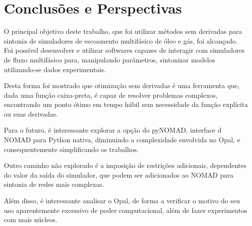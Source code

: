 \chapter{Conclusões e Perspectivas}
%
O principal objetivo deste trabalho, que foi utilizar métodos sem derivadas para sintonia de simuladores de escoamento multifásico de óleo e gás, foi alcançado.
%
Foi possível desenvolver e utilizar softwares capazes de interagir com simuladores de fluxo multifásico para, manipulando parâmetros, sintonizar modelos utilizando-se dados experimentais.
%

Desta forma foi mostrado que otimização sem derivadas é uma ferramenta que, dada uma função caixa-preta, é capaz de resolver problemas complexos, encontrando um ponto ótimo em tempo hábil sem necessidade da função explícita ou suas derivadas.
%

Para o futuro, é interessante explorar a opção do pyNOMAD, interface d NOMAD para Python nativa, diminuindo a complexidade envolvida no Opal, e consequentemente simplificando os trabalhos.
%

Outro caminho não explorado é a imposição de restrições adicionais, dependentes do valor da saída do simulador, que podem ser adicionados ao NOMAD para sintonia de redes mais complexas.
%

Além disso, é interessante analisar o Opal, de forma a verificar o motivo do seu uso aparentemente excessivo de poder computacional, além de fazer experimentos com mais núcleos.
%
